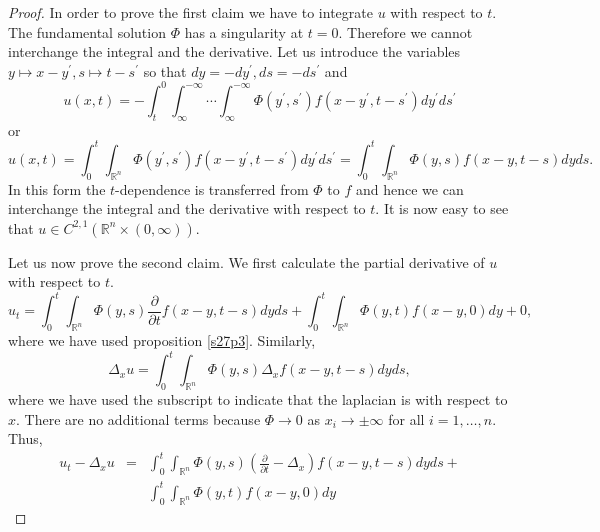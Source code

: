 \documentclass{article}
\theoremstyle{plain}
\numberwithin{thm}{section}
\theoremstyle{plain}
\numberwithin{prop}{section}
\theoremstyle{definition}
\numberwithin{defn}{section}
\theoremstyle{remark}
\numberwithin{equation}{section}
\begin{document}
\begin{proof}
In order to prove the first claim we have to integrate $u$ with respect to $t$. The fundamental solution $\Phi$ has
a singularity at $t = 0$. Therefore we cannot interchange the integral and the derivative. Let us introduce the 
variables $y \mapsto x - y^\prime, s \mapsto t - s^\prime$ so that $dy = -dy^\prime, ds = -ds^\prime$ and
\[
u(x, t) = -\int_t^0\int_{\infty}^{-\infty}\cdots\int_{\infty}^{-\infty}\Phi(y^\prime, s^\prime)f(x - y^\prime,
t - s^\prime)dy^\prime ds^\prime
\]
or
\[
u(x,t) = \int_0^t\int_{\mathbb{R}^n}\Phi(y^\prime, s^\prime)f(x - y^\prime, t - s^\prime)dy^\prime ds^\prime
= \int_0^t\int_{\mathbb{R}^n}\Phi(y, s)f(x - y, t - s)dyds.
\]
In this form the $t$-dependence is transferred from $\Phi$ to $f$ and hence we can interchange the integral and
the derivative with respect to $t$. It is now easy to see that $u \in C^{2, 1}(\mathbb{R}^n \times (0, \infty))$.

Let us now prove the second claim. We first calculate the partial derivative of $u$ with respect to $t$.
\[
u_t = \int_0^t\int_{\mathbb{R}^n}\Phi(y, s)\frac{\partial}{\partial t}f(x - y, t - s)dyds +
\int_0^t\int_{\mathbb{R}^n}\Phi(y, t)f(x - y, 0)dy + 0,
\]
where we have used proposition \ref{s27p3}. Similarly,
\[
\Delta_x u = \int_0^t\int_{\mathbb{R}^n}\Phi(y, s)\Delta_x f(x - y, t - s)dyds,
\]
where we have used the subscript to indicate that the laplacian is with respect to $x$. There are no additional
terms because $\Phi \rightarrow 0$ as $x_i \rightarrow \pm\infty$ for all $i = 1, \ldots, n$. Thus,
\begin{eqnarray*}
u_t - \Delta_x u &=& 
\int_0^t\int_{\mathbb{R}^n}\Phi(y, s)\left(\frac{\partial}{\partial t} - \Delta_x\right)f(x - y, t - s)dyds + \\
& & \int_0^t\int_{\mathbb{R}^n}\Phi(y, t)f(x - y, 0)dy
\end{eqnarray*}


\end{proof}
\end{document}
